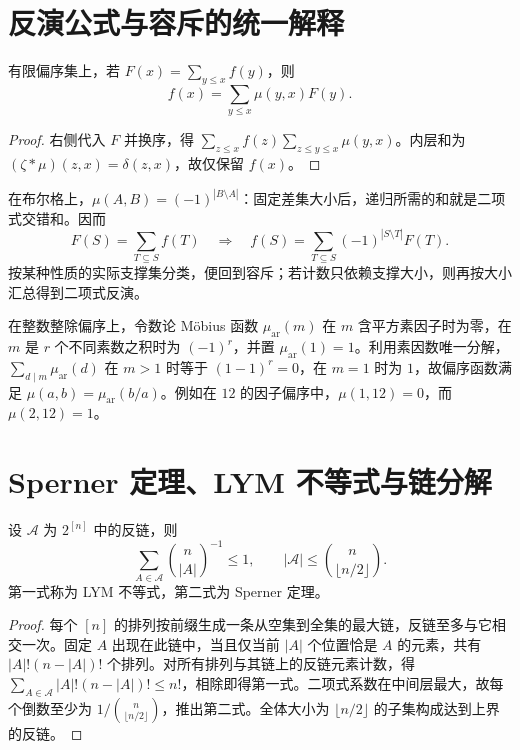 \section{反演公式与容斥的统一解释}

\begin{theorem}[M\"obius 反演]
有限偏序集上，若 $F(x)=\sum_{y\le x}f(y)$，则
\[
 f(x)=\sum_{y\le x}\mu(y,x)F(y).
\]
\end{theorem}
\begin{proof}
右侧代入 $F$ 并换序，得 $\sum_{z\le x}f(z)\sum_{z\le y\le x}\mu(y,x)$。内层和为 $(\zeta*\mu)(z,x)=\delta(z,x)$，故仅保留 $f(x)$。
\end{proof}

在布尔格上，$\mu(A,B)=(-1)^{|B\setminus A|}$：固定差集大小后，递归所需的和就是二项式交错和。因而
\[
 F(S)=\sum_{T\subseteq S}f(T)
 \quad\Longrightarrow\quad
 f(S)=\sum_{T\subseteq S}(-1)^{|S\setminus T|}F(T).
\]
按某种性质的实际支撑集分类，便回到容斥；若计数只依赖支撑大小，则再按大小汇总得到二项式反演。

在整数整除偏序上，令数论 M\"obius 函数 $\mu_{\mathrm{ar}}(m)$ 在 $m$ 含平方素因子时为零，在 $m$ 是 $r$ 个不同素数之积时为 $(-1)^r$，并置 $\mu_{\mathrm{ar}}(1)=1$。利用素因数唯一分解，$\sum_{d\mid m}\mu_{\mathrm{ar}}(d)$ 在 $m>1$ 时等于 $(1-1)^r=0$，在 $m=1$ 时为 $1$，故偏序函数满足 $\mu(a,b)=\mu_{\mathrm{ar}}(b/a)$。例如在 $12$ 的因子偏序中，$\mu(1,12)=0$，而 $\mu(2,12)=1$。

\section{Sperner 定理、LYM 不等式与链分解}

\begin{theorem}
设 $\mathcal A$ 为 $2^{[n]}$ 中的反链，则
\begin{equation}
 \sum_{A\in\mathcal A}\binom n{|A|}^{-1}\le1,
 \qquad |\mathcal A|\le\binom n{\lfloor n/2\rfloor}.
 \label{eq:sperner}
\end{equation}
第一式称为 LYM 不等式，第二式为 Sperner 定理。
\end{theorem}
\begin{proof}
每个 $[n]$ 的排列按前缀生成一条从空集到全集的最大链，反链至多与它相交一次。固定 $A$ 出现在此链中，当且仅当前 $|A|$ 个位置恰是 $A$ 的元素，共有 $|A|!(n-|A|)!$ 个排列。对所有排列与其链上的反链元素计数，得 $\sum_{A\in\mathcal A}|A|!(n-|A|)!\le n!$，相除即得第一式。二项式系数在中间层最大，故每个倒数至少为 $1/\binom n{\lfloor n/2\rfloor}$，推出第二式。全体大小为 $\lfloor n/2\rfloor$ 的子集构成达到上界的反链。
\end{proof}

